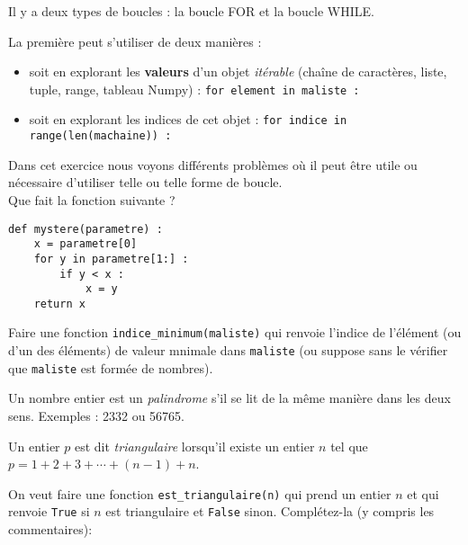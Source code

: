 


\exo

\begin{enonce}

	Il y a deux types de boucles : la boucle FOR et la boucle WHILE.

	La première peut s'utiliser de deux manières :
	\begin{itemize}
		\item soit en explorant les {\bf valeurs} d'un objet {\em itérable} (chaîne de caractères, liste, tuple, range, tableau Numpy) : \texttt{for element in maliste :}
		\item soit en explorant les indices de cet objet : \texttt{for indice in range(len(machaine)) :}
	\end{itemize}

	Dans cet exercice nous voyons différents problèmes où il peut être utile ou nécessaire d'utiliser telle ou telle forme de boucle.\\

	\quessques Que fait la fonction suivante ?

	\begin{verbatim}
def mystere(parametre) :
    x = parametre[0]
    for y in parametre[1:] :
        if y < x :
            x = y
    return x
\end{verbatim}

	\ssques Faire une fonction \texttt{indice\_minimum(maliste)} qui renvoie l'indice de l'élément (ou d'un des éléments) de valeur mnimale dans \texttt{maliste}  (ou suppose sans le vérifier que \texttt{maliste} est formée de nombres).

	\ques Un nombre entier est un {\em palindrome} s'il se lit de la même manière dans les deux sens. Exemples : 2332 ou 56765.

	Un entier $p$ est dit   {\em triangulaire} lorsqu'il existe un entier $n$ tel que $p=1+2+3+\cdots+(n-1)+n$.

	\ssques On veut faire  une fonction \texttt{est\_triangulaire(n)} qui prend un entier $n$ et qui renvoie \texttt{True} si $n$ est triangulaire et \texttt{False} sinon. Complétez-la (y compris les commentaires):


\end{enonce}
